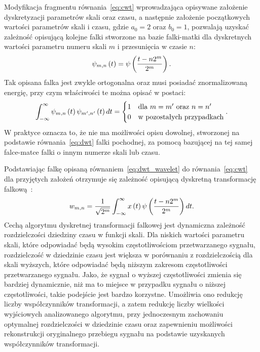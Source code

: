 Modyfikacja fragmentu równania~\eqref{eq:cwt} wprowadzająca opisywane założenie dyskretyzacji parametrów skali oraz czasu, a następnie założenie początkowych wartości parametrów skali i czasu, gdzie $a_{0} = 2$ oraz $b_{0} = 1$, pozwalają uzyskać zależność opisującą kolejne falki stworzone na bazie falki-matki dla dyskretnych wartości parametru numeru skali $m$ i przesunięcia w czasie $n$:
\begin{equation}
\psi_{m,n} \left(t\right) = \psi \left(\frac{t - n 2^{m}}{2^{m}}\right) \label{eq:dwt_wavelet}.
\end{equation}
Tak opisana falka jest zwykle ortogonalna oraz musi posiadać znormalizowaną energię, przy czym właściwości te można opisać w postaci:
\begin{equation}
\int _{-\infty} ^{\infty} \psi_{m,n} \emb{t} \psi_{m',n'} \emb{t} dt =
\begin{cases}
	1 & $dla $ m = m' $ oraz $ n = n' \\
	0 & $w pozostałych przypadkach$
\end{cases}
\label{eq:dwt_orthogonal_mather}.
\end{equation}
W praktyce oznacza to, że nie ma możliwości opisu dowolnej, stworzonej na podstawie równania~\eqref{eq:dwt} falki pochodnej, za pomocą bazującej na tej samej falce-matce falki o innym numerze skali lub czasu.

Podstawiając falkę opisaną równaniem~\eqref{eq:dwt_wavelet} do równania~\eqref{eq:cwt} dla przyjętych założeń otrzymuje się zależność opisującą dyskretną transformację falkową~\cite{shensa_dwt}:
\begin{equation}
w_{m,n} = \frac{1}{\sqrt{2^{m}}} \int _{-\infty} ^{\infty} x \left(t\right) \psi \left(\frac{t - n 2^{m}}{2^{m}}\right) dt \label{eq:dwt}.
\end{equation}
Cechą algorytmu dyskretnej transformacji falkowej jest dynamiczna zależność rozdzielczości dziedziny czasu w funkcji skali. Dla niskich wartości parametru skali, które odpowiadać będą wysokim częstotliwościom przetwarzanego sygnału, rozdzielczość w dziedzinie czasu jest większa w porównaniu z rozdzielczością dla skali wyższych, które odpowiadać będą niższym zakresom częstotliwości przetwarzanego sygnału. Jako, że sygnał o wyższej częstotliwości zmienia się bardziej dynamicznie, niż ma to miejsce w przypadku sygnału o niższej częstotliwości, takie podejście jest bardzo korzystne. Umożliwia ono redukcję liczby współczynników transformacji, a zatem redukcję liczby wielkości wyjściowych analizowanego algorytmu, przy jednoczesnym zachowaniu optymalnej rozdzielczości w dziedzinie czasu oraz zapewnieniu możliwości rekonstrukcji oryginalnego przebiegu sygnału na podstawie uzyskanych współczynników transformacji.

